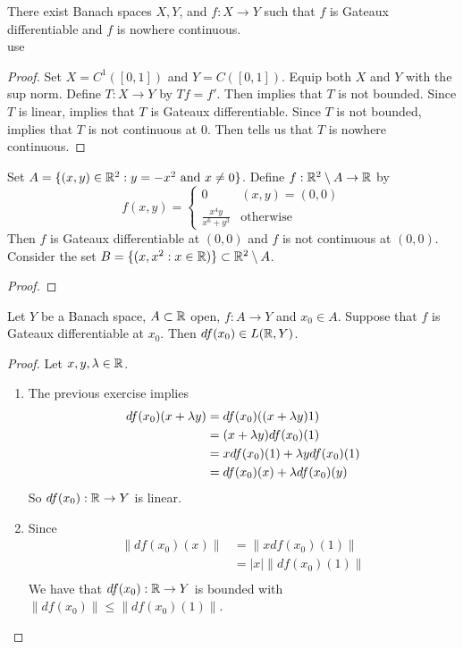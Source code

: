 \documentclass{book}
\begin{document}
	\begin{ex} 
	There exist Banach spaces $X,Y$, and $f:X \rightarrow Y$ such that $f$ is Gateaux differentiable and $f$ is nowhere continuous. \\
	 use 
	\end{ex}
	
	\begin{proof}
	Set $X = C^1([0, 1])$ and $Y = C([0,1])$. Equip both $X$ and $Y$ with the sup norm. Define $T: X \rightarrow Y$ by $Tf = f'$. Then  implies that $T$ is not bounded. Since $T$ is linear,  implies that $T$ is Gateaux differentiable. Since $T$ is not bounded,  implies that $T$ is not continuous at $0$. Then  tells us that $T$ is nowhere continuous. 
	\end{proof}
	
	\begin{ex} 
	Set $A = \{(x,y) \in \mathbb{R}^2: y = -x^2 \text{ and } x \neq 0\}$. Define $f: \mathbb{R}^2 \setminus A \rightarrow \mathbb{R}$ by 
	\[f(x,y) = 
	\begin{cases}
	0 & (x,y) = (0,0) \\
	\frac{x^4y}{x^6 + y^3} & \text{otherwise}
	\end{cases}	
	\]
	Then $f$ is Gateaux differentiable at $(0,0)$ and $f$ is not continuous at $(0,0)$. \\
	 Consider the set $B = \{(x, x^2:x \in \mathbb{R})\} \subset \mathbb{R}^2 \setminus A$. 
	\end{ex}
	
	\begin{proof}
	
	\end{proof}
	
	
	
	\begin{ex} 
	Let $Y$ be a Banach space, $A \subset \mathbb{R}$ open, $f:A \rightarrow Y$ and $x_0 \in A$. Suppose that $f$ is Gateaux differentiable at $x_0$. Then $df(x_0) \in L(\mathbb{R},Y)$.
	\end{ex}
	
	\begin{proof}
	Let $x,y ,\lambda \in \mathbb{R}$. 
	\begin{enumerate}
	\item The previous exercise implies 
	\begin{align*}
	df(x_0)(x + \lambda y) 
	&= df(x_0)((x+\lambda y)1)  \\
	&= (x+\lambda y)df(x_0)(1) \\
	&= xdf(x_0)(1) + \lambda y df(x_0)(1) \\
	&= df(x_0)(x) + \lambda df(x_0)(y)
	\end{align*}
	So $df(x_0):\mathbb{R} \rightarrow Y$ is linear.
	\item Since 
	\begin{align*}
	\|df(x_0)(x)\| 
	&= \|xdf(x_0)(1)\| \\
	&= |x| \|df(x_0)(1)\| \\
	\end{align*}	
	We have that $df(x_0):\mathbb{R} \rightarrow Y$ is bounded with $\|df(x_0)\| \leq \|df(x_0)(1)\|$. 
	\end{enumerate}
	\end{proof}
	
\end{document}
